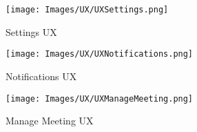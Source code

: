 \begin{figure}[h]
	\centering\texttt{[image: Images/UX/UXSettings.png]}{}
	\caption{Settings UX}
\end{figure}

\begin{figure}[h]
	\centering\texttt{[image: Images/UX/UXNotifications.png]}{}
	\caption{Notifications UX}
\end{figure}

\begin{figure}[h]
	\centering\texttt{[image: Images/UX/UXManageMeeting.png]}{}
	\caption{Manage Meeting UX}
\end{figure}
\clearpage